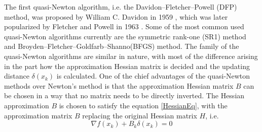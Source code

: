 The first quasi-Newton algorithm, i.e. the Davidon–Fletcher–Powell (DFP) method, was proposed by William C. Davidon in 1959 \cite{WilDav59}, which was later popularized by Fletcher and Powell in 1963 \cite{FlePow63}. Some of the most common used quasi-Newton algorithms currently are the symmetric rank-one (SR1) method \cite{ANP91} and Broyden–Fletcher–Goldfarb–Shanno(BFGS) method. The family of the quasi-Newton algorithms are similar in nature, with most of the difference arising in the part how the approximation Hessian matrix is decided and the updating distance $\delta(x_k) $ is calculated. One of the chief advantages of the quasi-Newton methods over Newton's method is that the approximation Hessian matrix $B$ can be chosen in a way that no matrix needs to be directly inverted. The Hessian approximation $B$ is chosen to satisfy the equation \ref{HessianEq}, with the approximation matrix $B$ replacing the original Hessian matrix $H$, i.e. 
\begin{equation}
	\nabla f(x_k) +B_k\delta(x_k) =0
	\label{HessianAppro}
\end{equation}

